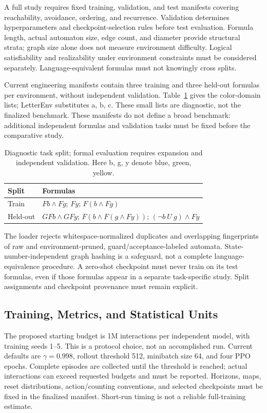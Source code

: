 \documentclass[conference]{IEEEtran}
\begin{document}
A full study requires fixed training, validation, and test manifests covering reachability, avoidance, ordering, and recurrence. Validation determines hyperparameters and checkpoint-selection rules before test evaluation. Formula length, actual automaton size, edge count, and diameter provide structural strata; graph size alone does not measure environment difficulty. Logical satisfiability and realizability under environment constraints must be considered separately. Language-equivalent formulas must not knowingly cross splits.

Current engineering manifests contain three training and three held-out formulas per environment, without independent validation. Table~\ref{tab:smoke_tasks} gives the color-domain lists; LetterEnv substitutes a, b, c. These small lists are diagnostic, not the finalized benchmark. These manifests do not define a broad benchmark: additional independent formulas and validation tasks must be fixed before the comparative study.

\begin{table}[t]
\caption{Diagnostic task split; formal evaluation requires expansion and independent validation. Here b, g, y denote blue, green, yellow.}
\label{tab:smoke_tasks}
\centering\small
\begin{tabular}{@{}lp{}@{}}
\toprule
Split & Formulas \\ \midrule
Train & $Fb\land Fg$; $Fy$; $F(b\land Fg)$ \\
Held-out & $GFb\land GFy$; $F(b\land F(g\land Fy))$; $(\neg b\ U\ g)\land Fy$ \\
\bottomrule
\end{tabular}
\end{table}

The loader rejects whitespace-normalized duplicates and overlapping fingerprints of raw and environment-pruned, guard/acceptance-labeled automata. State-number-independent graph hashing is a safeguard, not a complete language-equivalence procedure. A zero-shot checkpoint must never train on its test formulas, even if those formulas appear in a separate task-specific study. Split assignments and checkpoint provenance must remain explicit.

\subsection{Training, Metrics, and Statistical Units}
The proposed starting budget is 1M interactions per independent model, with training seeds 1--5. This is a protocol choice, not an accomplished run. Current defaults are $\gamma=0.998$, rollout threshold 512, minibatch size 64, and four PPO epochs. Complete episodes are collected until the threshold is reached; actual interactions can exceed requested budgets and must be reported. Horizons, maps, reset distributions, action/counting conventions, and selected checkpoints must be fixed in the finalized manifest. Short-run timing is not a reliable full-training estimate.
\end{document}
